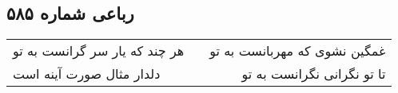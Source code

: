 \begin{center}
\section*{رباعی شماره ۵۸۵}
\label{sec:sh585}
\begin{longtable}{l p{0.5cm} r}
هر چند که یار سر گرانست به تو
&&
غمگین نشوی که مهربانست به تو
\\
دلدار مثال صورت آینه است
&&
تا تو نگرانی نگرانست به تو
\\
\end{longtable}
\end{center}
